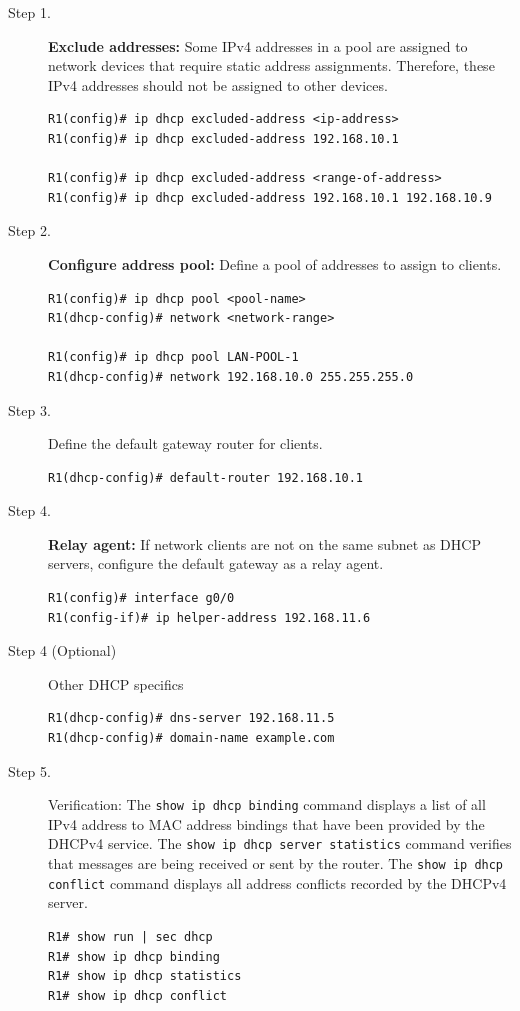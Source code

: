 \begin{description}
\item[Step 1.] \textbf{Exclude addresses:} Some IPv4 addresses in a pool are assigned to network devices that require static address assignments. Therefore, these IPv4 addresses should not be assigned to other devices.

\begin{verbatim}
R1(config)# ip dhcp excluded-address <ip-address>
R1(config)# ip dhcp excluded-address 192.168.10.1

R1(config)# ip dhcp excluded-address <range-of-address>
R1(config)# ip dhcp excluded-address 192.168.10.1 192.168.10.9
\end{verbatim}

\item[Step 2.] \textbf{Configure address pool:} Define a pool of addresses to assign to clients.

\begin{verbatim}
R1(config)# ip dhcp pool <pool-name>
R1(dhcp-config)# network <network-range>

R1(config)# ip dhcp pool LAN-POOL-1
R1(dhcp-config)# network 192.168.10.0 255.255.255.0
\end{verbatim}

\item[Step 3.] Define the default gateway router for clients. 

\begin{verbatim}
R1(dhcp-config)# default-router 192.168.10.1
\end{verbatim}

\item[Step 4.] \textbf{Relay agent:} If network clients are not on the same subnet as DHCP servers, configure the default gateway as a relay agent.

\begin{verbatim}
R1(config)# interface g0/0
R1(config-if)# ip helper-address 192.168.11.6
\end{verbatim}

\item[Step 4 (Optional)] Other DHCP specifics

\begin{verbatim}
R1(dhcp-config)# dns-server 192.168.11.5
R1(dhcp-config)# domain-name example.com
\end{verbatim}

\item[Step 5.] Verification: The \verb|show ip dhcp binding| command displays a list of all IPv4 address to MAC address bindings that have been provided by the DHCPv4 service. The \verb|show ip dhcp server statistics| command verifies that messages are being received or sent by the router. The \verb|show ip dhcp conflict| command displays all address conflicts recorded by the DHCPv4 server.

\begin{verbatim}
R1# show run | sec dhcp
R1# show ip dhcp binding
R1# show ip dhcp statistics
R1# show ip dhcp conflict
\end{verbatim}

\end{description}

